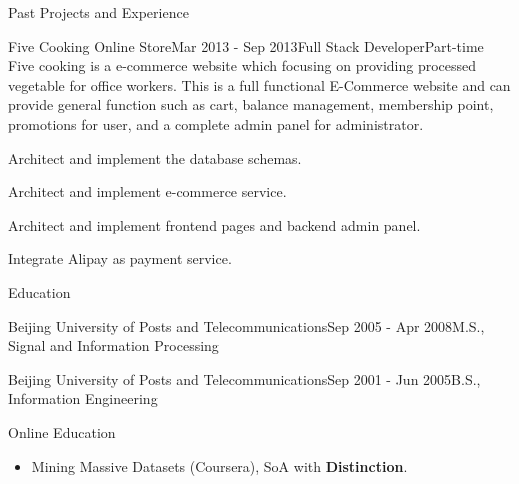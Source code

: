 \documentclass{resume} %
\begin{document}
\begin{rSection}{Past Projects and Experience}
\begin{rSubsection}{Five Cooking Online Store}{Mar 2013 - Sep 2013}{Full Stack Developer}{Part-time}
Five cooking is a e-commerce website which focusing on providing processed vegetable for office workers. This is a full functional E-Commerce website and can provide general function such as cart, balance management, membership point, promotions for user, and a complete admin panel for administrator.

\begin{rSubsectionList}
\item Architect and implement the database schemas.
\item Architect and implement e-commerce service.
\item Architect and implement frontend pages and backend admin panel.
\item Integrate Alipay as payment service.
\end{rSubsectionList}
\end{rSubsection}



\end{rSection}


\begin{rSection}{Education}
\begin{rSubsection}{Beijing University of Posts and Telecommunications}{Sep 2005 - Apr 2008}{M.S., Signal and Information Processing}{}
\end{rSubsection}

\begin{rSubsection}{Beijing University of Posts and Telecommunications}{Sep 2001 - Jun 2005}{B.S., Information Engineering}{}
\end{rSubsection}

\begin{rSubsection}{Online Education}{}{}{}
  \begin{itemize}
    \item Mining Massive Datasets (Coursera), SoA with \textbf{Distinction}.
  \end{itemize}
\end{rSubsection}

\end{rSection}
\end{document}

